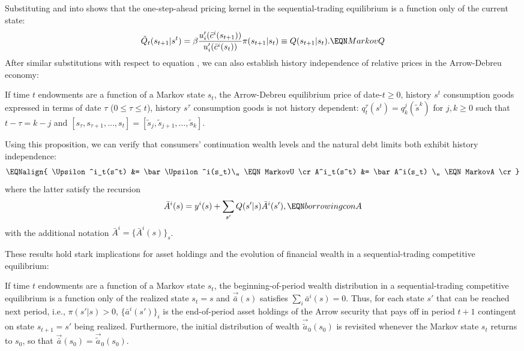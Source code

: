 Substituting  and  into
 shows that the one-step-ahead pricing kernel in the sequential-trading
equilibrium is   a function only of the current state:
$$
\tilde Q_t(s_{t+1} | s^t) = \beta
{ u'_i(\bar c^i(s_{t+1})) \over u'_i(\bar c^i(s_t)) }
\pi(s_{t+1} | s_t) \equiv Q(s_{t+1} | s_t).   \EQN MarkovQ
$$
After similar substitutions with respect to equation ,
we can also
establish history independence of  relative prices in the
Arrow-Debreu economy:




\medskip
{}  If time $t$  endowments are a function of a Markov
state $s_t$, the Arrow-Debreu equilibrium price of date-$t\geq 0$,
history $s^t$
consumption goods expressed in terms of date $\tau$ ($0\leq \tau \leq t$),
history $s^\tau$
consumption goods is not history dependent:
$q^\tau_t(s^t) = q^{j}_{k}(\tilde s^{k})$ for $j, k \geq 0$
such that $t-\tau=k-j$ and
$[s_\tau, s_{\tau+1}, \ldots , s_t] =
 [\tilde s_{j}, \tilde s_{j+1}, \ldots , \tilde s_{k}]$.
\medskip

\noindent
Using this proposition, we can verify that consumers' 
continuation wealth levels  and
the natural debt limits  both
exhibit history independence:
$$\EQNalign{
 \Upsilon^i_t(s^t) &= \bar \Upsilon^i(s_t)\,, \EQN MarkovU 
\cr
 A^i_t(s^t) &= \bar A^i(s_t) \,,              \EQN MarkovA 
\cr}
$$
where the latter satisfy the recursion
$$ \bar A^i(s) = y^i(s) + \sum_{s'} Q(s'|s) \bar A^i(s'),  \EQN borrowingconA $$
with the additional notation 
$\bar A^i = \{\bar A^i(s)\}_s$.


These results hold stark implications for asset holdings
and the evolution of financial wealth in a 
sequential-trading competitive equilibrium:

\medskip
{} If time $t$ endowments are 
a function of a Markov state $s_t$, 
the beginning-of-period wealth distribution in a
sequential-trading competitive equilibrium is
a function only of the realized state $s_t=s$ and
$\vec {\bar a}(s)$ satisfies $\sum_i \bar a^i(s)=0$.
Thus, for each state $s'$ that can be reached next 
period, i.e., $\pi(s'|s)>0$, $\{\bar a^i(s')\}_i$ is the 
end-of-period asset holdings of the Arrow security that 
pays off in period $t+1$ contingent on state $s_{t+1}=s'$
being realized. Furthermore, the initial distribution of 
wealth $\vec {\tilde a}_0(s_0)$ is revisited whenever 
the Markov state $s_t$ returns to $s_0$, so that 
$\vec {\bar a}(s_0) = \vec {\tilde a}_0(s_0)$.
\medskip


